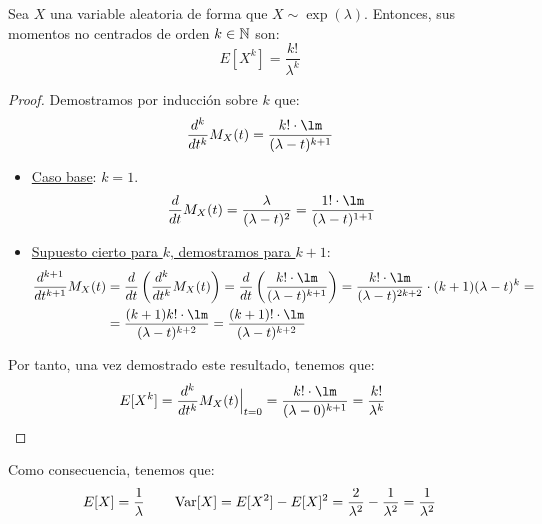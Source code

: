 \begin{prop}
    Sea $X$ una variable aleatoria de forma que $X\sim\exp(\lambda)$. Entonces, sus momentos no centrados de orden $k\in \mathbb{N}$ son:
    \begin{equation*}
        E[X^k] = \dfrac{k!}{\lambda^k}
    \end{equation*}
\end{prop}
\begin{proof}
    Demostramos por inducción sobre $k$ que:
    \begin{equation*}
        \dfrac{d^k}{dt^k} M_X(t) = \dfrac{k!\cdot \lm}{(\lambda-t)^{k+1}}
    \end{equation*}
    \begin{itemize}
        \item \ul{Caso base}: $k=1$.
        \begin{equation*}
            \dfrac{d}{dt} M_X(t) = \dfrac{\lambda}{(\lambda-t)^2} = \dfrac{1! \cdot \lm}{(\lambda-t)^{1+1}}
        \end{equation*}

        \item \ul{Supuesto cierto para $k$, demostramos para $k+1$}:
        \begin{align*}
            \dfrac{d^{k+1}}{dt^{k+1}} M_X(t) &= \dfrac{d}{dt} \left( \dfrac{d^k}{dt^k} M_X(t) \right)
            = \dfrac{d}{dt} \left( \dfrac{k!\cdot \lm}{(\lambda-t)^{k+1}} \right)
            = \dfrac{k!\cdot \lm}{(\lambda-t)^{2k+2}}\cdot (k+1)(\lambda-t)^k
            =\\&= \dfrac{(k+1)k! \cdot \lm}{(\lambda-t)^{k+2}}
            = \dfrac{(k+1)! \cdot \lm}{(\lambda-t)^{k+2}}
        \end{align*}        
    \end{itemize}

    Por tanto, una vez demostrado este resultado, tenemos que:
    \begin{align*}
        E[X^k] &= \dfrac{d^k}{dt^k} M_X(t) \Big|_{t=0}
        = \dfrac{k! \cdot \lm}{(\lambda-0)^{k+1}}
        = \dfrac{k!}{\lambda^k}
    \end{align*}
\end{proof}

Como consecuencia, tenemos que:
\begin{equation*}
    E[X] = \dfrac{1}{\lambda} \qquad \operatorname{Var}[X] = E[X^2] - E[X]^2 = \dfrac{2}{\lambda^2} - \dfrac{1}{\lambda^2} = \dfrac{1}{\lambda^2}
\end{equation*}


